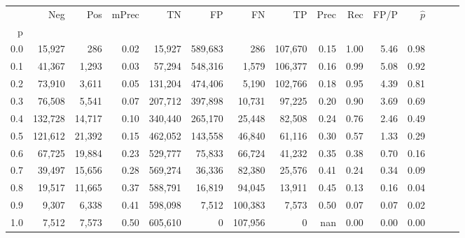 \begin{tabular}{rrrrrrrrrrrrrrr}
\toprule
{} &      Neg &     Pos & mPrec &       TN &       FP &       FN &       TP &  Prec &   Rec &  FP/P & $\hat{p}$ \\
p   &          &         &       &          &          &          &          &       &       &       &           \\
\midrule
0.0 &   15,927 &     286 &  0.02 &   15,927 &  589,683 &      286 &  107,670 &  0.15 &  1.00 &  5.46 &      0.98 \\
0.1 &   41,367 &   1,293 &  0.03 &   57,294 &  548,316 &    1,579 &  106,377 &  0.16 &  0.99 &  5.08 &      0.92 \\
0.2 &   73,910 &   3,611 &  0.05 &  131,204 &  474,406 &    5,190 &  102,766 &  0.18 &  0.95 &  4.39 &      0.81 \\
0.3 &   76,508 &   5,541 &  0.07 &  207,712 &  397,898 &   10,731 &   97,225 &  0.20 &  0.90 &  3.69 &      0.69 \\
0.4 &  132,728 &  14,717 &  0.10 &  340,440 &  265,170 &   25,448 &   82,508 &  0.24 &  0.76 &  2.46 &      0.49 \\
0.5 &  121,612 &  21,392 &  0.15 &  462,052 &  143,558 &   46,840 &   61,116 &  0.30 &  0.57 &  1.33 &      0.29 \\
0.6 &   67,725 &  19,884 &  0.23 &  529,777 &   75,833 &   66,724 &   41,232 &  0.35 &  0.38 &  0.70 &      0.16 \\
0.7 &   39,497 &  15,656 &  0.28 &  569,274 &   36,336 &   82,380 &   25,576 &  0.41 &  0.24 &  0.34 &      0.09 \\
0.8 &   19,517 &  11,665 &  0.37 &  588,791 &   16,819 &   94,045 &   13,911 &  0.45 &  0.13 &  0.16 &      0.04 \\
0.9 &    9,307 &   6,338 &  0.41 &  598,098 &    7,512 &  100,383 &    7,573 &  0.50 &  0.07 &  0.07 &      0.02 \\
1.0 &    7,512 &   7,573 &  0.50 &  605,610 &        0 &  107,956 &        0 &   nan &  0.00 &  0.00 &      0.00 \\
\bottomrule
\end{tabular}
